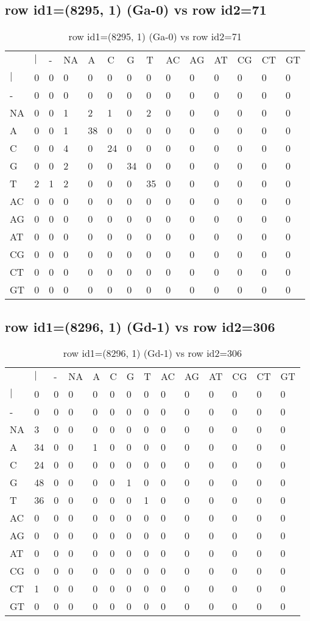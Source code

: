 \subsection{row id1=(8295, 1) (Ga-0) vs row id2=71}
\begin{center}
\begin{longtable}{|l|l|l|l|l|l|l|l|l|l|l|l|l|l|}
\caption{row id1=(8295, 1) (Ga-0) vs row id2=71} \label{table_dm464}\\
\hline
\\
\hline
&$|$&-&NA&A&C&G&T&AC&AG&AT&CG&CT&GT\\
$|$&0&0&0&0&0&0&0&0&0&0&0&0&0\\
-&0&0&0&0&0&0&0&0&0&0&0&0&0\\
NA&0&0&1&2&1&0&2&0&0&0&0&0&0\\
A&0&0&1&38&0&0&0&0&0&0&0&0&0\\
C&0&0&4&0&24&0&0&0&0&0&0&0&0\\
G&0&0&2&0&0&34&0&0&0&0&0&0&0\\
T&2&1&2&0&0&0&35&0&0&0&0&0&0\\
AC&0&0&0&0&0&0&0&0&0&0&0&0&0\\
AG&0&0&0&0&0&0&0&0&0&0&0&0&0\\
AT&0&0&0&0&0&0&0&0&0&0&0&0&0\\
CG&0&0&0&0&0&0&0&0&0&0&0&0&0\\
CT&0&0&0&0&0&0&0&0&0&0&0&0&0\\
GT&0&0&0&0&0&0&0&0&0&0&0&0&0\\
\hline
\end{longtable}
\end{center}

\subsection{row id1=(8296, 1) (Gd-1) vs row id2=306}
\begin{center}
\begin{longtable}{|l|l|l|l|l|l|l|l|l|l|l|l|l|l|}
\caption{row id1=(8296, 1) (Gd-1) vs row id2=306} \label{table_dm466}\\
\hline
\\
\hline
&$|$&-&NA&A&C&G&T&AC&AG&AT&CG&CT&GT\\
$|$&0&0&0&0&0&0&0&0&0&0&0&0&0\\
-&0&0&0&0&0&0&0&0&0&0&0&0&0\\
NA&3&0&0&0&0&0&0&0&0&0&0&0&0\\
A&34&0&0&1&0&0&0&0&0&0&0&0&0\\
C&24&0&0&0&0&0&0&0&0&0&0&0&0\\
G&48&0&0&0&0&1&0&0&0&0&0&0&0\\
T&36&0&0&0&0&0&1&0&0&0&0&0&0\\
AC&0&0&0&0&0&0&0&0&0&0&0&0&0\\
AG&0&0&0&0&0&0&0&0&0&0&0&0&0\\
AT&0&0&0&0&0&0&0&0&0&0&0&0&0\\
CG&0&0&0&0&0&0&0&0&0&0&0&0&0\\
CT&1&0&0&0&0&0&0&0&0&0&0&0&0\\
GT&0&0&0&0&0&0&0&0&0&0&0&0&0\\
\hline
\end{longtable}
\end{center}

